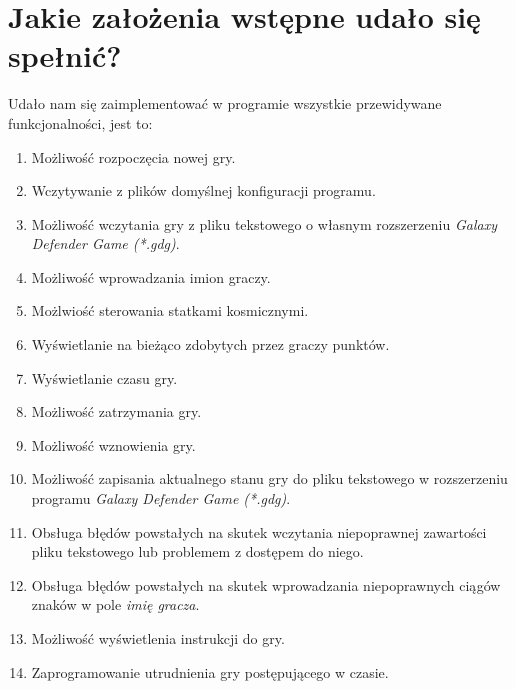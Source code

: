 \documentclass[a4paper]{article}
\begin{document}
\section{Jakie założenia wstępne udało się spełnić?}
Udało nam się zaimplementować w programie wszystkie przewidywane funkcjonalności, jest to:
\begin{enumerate}
    \item Możliwość rozpoczęcia nowej gry.
    \item Wczytywanie z plików domyślnej konfiguracji programu.
    \item Możliwość wczytania gry z pliku tekstowego o własnym rozszerzeniu \textit{Galaxy Defender Game (*.gdg)}.
    \item Możliwość wprowadzania imion graczy.
    \item Możlwiość sterowania statkami kosmicznymi.
    \item Wyświetlanie na bieżąco zdobytych przez graczy punktów.
    \item Wyświetlanie czasu gry.
    \item Możliwość zatrzymania gry.
    \item Możliwość wznowienia gry.
    \item Możliwość zapisania aktualnego stanu gry do pliku tekstowego w rozszerzeniu programu \textit{Galaxy Defender Game (*.gdg)}.
    \item Obsługa błędów powstałych na skutek wczytania niepoprawnej zawartości pliku tekstowego lub problemem z dostępem do niego.
    \item Obsługa błędów powstałych na skutek wprowadzania niepoprawnych ciągów znaków w pole \textit{imię gracza}.
    \item Możliwość wyświetlenia instrukcji do gry.
    \item Zaprogramowanie utrudnienia gry postępującego w czasie.
\end{enumerate}
\end{document}
